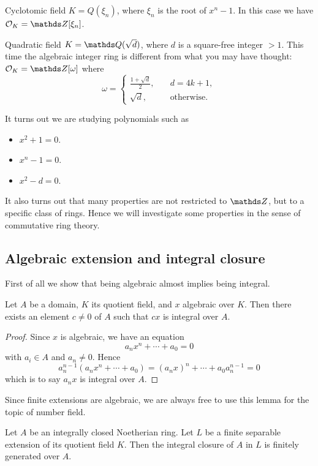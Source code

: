 			\begin{example}
				Cyclotomic field $K=Q(\xi_n)$, where $\xi_n$ is the root of $x^n-1$. In this case we have $\OK = \Z[\xi_n]$.
			\end{example}
			
			\begin{example}
				Quadratic field $K=\Q(\sqrt{d})$, where $d$ is a square-free integer $>1$. This time the algebraic integer ring is different from what you may have thought: $\OK = \Z[\omega]$ where
				\[
				\omega = \begin{cases}
					\frac{1+\sqrt{d}}{2}, &\quad d = 4k+1, \\
					\sqrt{d}, &\quad \text{otherwise}.
				\end{cases}
				\]
			\end{example}
			It turns out we are studying polynomials such as
			\begin{itemize}
				\item $x^2+1=0$.
				\item $x^n-1=0$.
				\item $x^2-d=0$.
			\end{itemize}
		It also turns out that many properties are not restricted to $\Z$, but to a specific class of rings. Hence we will investigate some properties in the sense of commutative ring theory.
		\subsection{Algebraic extension and integral closure}
			First of all we show that being algebraic almost implies being integral. 
			\begin{lemma}\label{alg-int}
				Let $A$ be a domain, $K$ its quotient field, and $x$ algebraic over $K$. Then there exists an element $c \ne 0$ of $A$ such that $cx$ is integral over $A$.
			\end{lemma}
			\begin{proof}
				Since $x$ is algebraic, we have an equation
				\[
					a_nx^n+\cdots+a_0=0
				\]
				with $a_i \in A$ and $a_n \ne 0$. Hence
				\[
					a_n^{n-1}(a_nx^n+\cdots+a_0)=(a_nx)^n+\cdots+a_0a_n^{n-1}=0
				\]
				which is to say $a_nx$ is integral over $A$. 
			\end{proof}
			
			Since finite extensions are algebraic, we are always free to use this lemma for the topic of number field.
			
			\begin{theorem}\label{closure-f-g}
				Let $A$ be an integrally closed Noetherian ring. Let $L$ be a finite separable extension of its quotient field $K$. Then the integral closure of $A$ in $L$ is finitely generated over $A$.
			\end{theorem}
		
